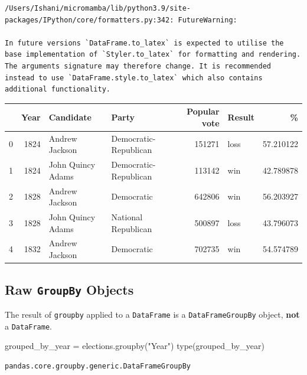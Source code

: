 \documentclass[
  letterpaper,
  DIV=11,
  numbers=noendperiod]{scrreprt}
\newenvironment{Shaded}{\begin{snugshade}}{\end{snugshade}}
\newcommand{\BuiltInTok}[1]{\textcolor[rgb]{0.00,0.23,0.31}{#1}}
\newcommand{\NormalTok}[1]{\textcolor[rgb]{0.00,0.23,0.31}{#1}}
\newcommand{\OperatorTok}[1]{\textcolor[rgb]{0.37,0.37,0.37}{#1}}
\newcommand{\StringTok}[1]{\textcolor[rgb]{0.13,0.47,0.30}{#1}}
\begin{document}
\begin{verbatim}
/Users/Ishani/micromamba/lib/python3.9/site-packages/IPython/core/formatters.py:342: FutureWarning:

In future versions `DataFrame.to_latex` is expected to utilise the base implementation of `Styler.to_latex` for formatting and rendering. The arguments signature may therefore change. It is recommended instead to use `DataFrame.style.to_latex` which also contains additional functionality.
\end{verbatim}

\begin{tabular}{lrllrlr}
\toprule
{} &  Year &          Candidate &                  Party &  Popular vote & Result &          \% \\
\midrule
0 &  1824 &     Andrew Jackson &  Democratic-Republican &        151271 &   loss &  57.210122 \\
1 &  1824 &  John Quincy Adams &  Democratic-Republican &        113142 &    win &  42.789878 \\
2 &  1828 &     Andrew Jackson &             Democratic &        642806 &    win &  56.203927 \\
3 &  1828 &  John Quincy Adams &    National Republican &        500897 &   loss &  43.796073 \\
4 &  1832 &     Andrew Jackson &             Democratic &        702735 &    win &  54.574789 \\
\bottomrule
\end{tabular}

\hypertarget{raw-groupby-objects}{%
\subsection{\texorpdfstring{Raw \texttt{GroupBy}
Objects}{Raw GroupBy Objects}}\label{raw-groupby-objects}}

The result of \texttt{groupby} applied to a \texttt{DataFrame} is a
\texttt{DataFrameGroupBy} object, \textbf{not} a \texttt{DataFrame}.

\begin{Shaded}
\begin{Highlighting}[]
\NormalTok{grouped\_by\_year }\OperatorTok{=}\NormalTok{ elections.groupby(}\StringTok{"Year"}\NormalTok{)}
\BuiltInTok{type}\NormalTok{(grouped\_by\_year)}
\end{Highlighting}
\end{Shaded}

\begin{verbatim}
pandas.core.groupby.generic.DataFrameGroupBy
\end{verbatim}
\end{document}
